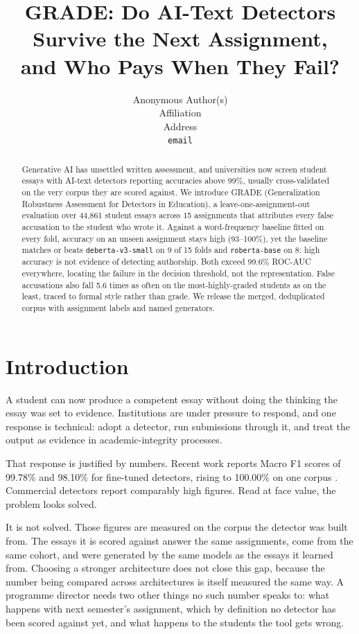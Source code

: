 \documentclass{article}
\title{GRADE: Do AI-Text Detectors Survive the Next Assignment,\\
and Who Pays When They Fail?}
\author{%
  Anonymous Author(s)\\
  Affiliation\\
  Address\\
  \texttt{email}
}
\begin{document}
\maketitle

\begin{abstract}
Generative AI has unsettled written assessment, and universities now screen
student essays with AI-text detectors reporting accuracies above 99\%,
usually cross-validated on the very corpus they are scored against. We
introduce GRADE (Generalization Robustness Assessment for Detectors in
Education), a leave-one-assignment-out evaluation over 44{,}861 student
essays across 15 assignments that attributes every false accusation to the
student who wrote it. Against a word-frequency baseline fitted on every
fold, accuracy on an unseen assignment stays high (93--100\%), yet the
baseline matches or beats \texttt{deberta-v3-small} on 9 of 15 folds and
\texttt{roberta-base} on 8: high accuracy is not evidence of detecting
authorship. Both exceed 99.6\% ROC-AUC everywhere, locating the failure in
the decision threshold, not the representation. False accusations also fall
5.6 times as often on the most-highly-graded students as on the least,
traced to formal style rather than grade. We release the merged,
deduplicated corpus with assignment labels and named generators.
\end{abstract}

\section{Introduction}

A student can now produce a competent essay without doing the thinking the
essay was set to evidence. Institutions are under pressure to respond, and
one response is technical: adopt a detector, run submissions through it,
and treat the output as evidence in academic-integrity processes.

That response is justified by numbers. Recent work reports Macro F1 scores
of 99.78\% and 98.10\% for fine-tuned detectors, rising to 100.00\% on one
corpus \cite{qorich2025}. Commercial detectors report comparably high
figures. Read at face value, the problem looks solved.

It is not solved. Those figures are measured on the corpus the detector was
built from. The essays it is scored against answer the same assignments,
come from the same cohort, and were generated by the same models as the
essays it learned from. Choosing a stronger architecture does not close
this gap, because the number being compared across architectures is itself
measured the same way. A programme director needs two other things no such
number speaks to: what happens with next semester's assignment, which by
definition no detector has been scored against yet, and what happens to the
students the tool gets wrong.
\end{document}
